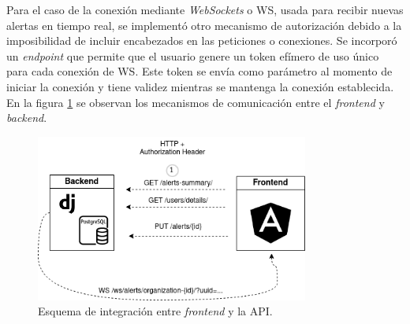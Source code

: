 Para el caso de la conexión mediante \textit{WebSockets} o WS, usada para recibir nuevas alertas en tiempo real, se implementó otro mecanismo de autorización debido a la imposibilidad de incluir encabezados en las peticiones o conexiones. Se incorporó un \textit{endpoint} que permite que el usuario genere un token efímero de uso único para cada conexión de WS. Este token se envía como parámetro al momento de iniciar la conexión y tiene validez mientras se mantenga la conexión establecida. En la figura \ref{integracion:3} se observan los mecanismos de comunicación entre el \textit{frontend} y \textit{backend}.

\begin{figure}[H]
	\centering
	\includegraphics[width=0.8\textwidth]{./Figures/integracion-3.png}
	\caption{Esquema de integración entre \textit{frontend} y la API.}
	\label{integracion:3}
\end{figure}


